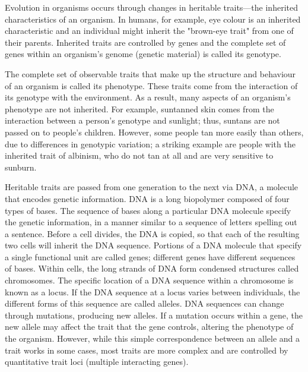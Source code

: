 Evolution in organisms occurs through changes in heritable traits—the inherited characteristics of
an organism. 
In humans, for example, eye colour is an inherited characteristic and an individual might inherit 
the "brown-eye trait" from one of their parents.
Inherited traits are controlled by genes and the complete set of genes within an organism's genome
(genetic material) is called its genotype.

The complete set of observable traits that make up the structure and behaviour of an organism is
called its phenotype. 
These traits come from the interaction of its genotype with the environment. 
As a result, many aspects of an organism's phenotype are not inherited. For example, suntanned skin
comes from the interaction between a person's genotype and sunlight; thus, suntans are not passed
on to people's children.
However, some people tan more easily than others, due to differences in genotypic variation;
a striking example are people with the inherited trait of albinism,
who do not tan at all and are very sensitive to sunburn.

Heritable traits are passed from one generation to the next via DNA, a molecule that encodes 
genetic information. DNA is a long biopolymer composed of four types of bases.
The sequence of bases along a particular DNA molecule specify the genetic information,
in a manner similar to a sequence of letters spelling out a sentence.
Before a cell divides, the DNA is copied, so that each of the resulting two cells will inherit the
DNA sequence. Portions of a DNA molecule that specify a single functional unit are called genes;
different genes have different sequences of bases.
Within cells, the long strands of DNA form condensed structures called chromosomes.
The specific location of a DNA sequence within a chromosome is known as a locus.
If the DNA sequence at a locus varies between individuals, the different forms of this sequence
are called alleles. DNA sequences can change through mutations, producing new alleles.
If a mutation occurs within a gene, the new allele may affect the trait that the gene controls,
altering the phenotype of the organism.
However, while this simple correspondence between an allele and a trait works in some cases, 
most traits are more complex and are controlled by quantitative trait loci
(multiple interacting genes).

